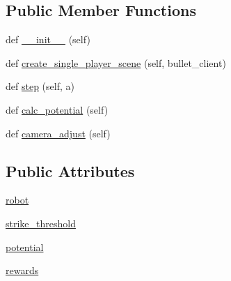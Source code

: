\subsection*{Public Member Functions}
\begin{DoxyCompactItemize}
\item 
def \hyperlink{classpybullet-gym_1_1pybulletgym_1_1envs_1_1roboschool_1_1envs_1_1manipulation_1_1striker__env_1_1_striker_bullet_env_adf904f8a8e85ff0232adb4330beccd10}{\+\_\+\+\_\+init\+\_\+\+\_\+} (self)
\item 
def \hyperlink{classpybullet-gym_1_1pybulletgym_1_1envs_1_1roboschool_1_1envs_1_1manipulation_1_1striker__env_1_1_striker_bullet_env_a7b9fff6ae593b43dbff4164d22d7d0a7}{create\+\_\+single\+\_\+player\+\_\+scene} (self, bullet\+\_\+client)
\item 
def \hyperlink{classpybullet-gym_1_1pybulletgym_1_1envs_1_1roboschool_1_1envs_1_1manipulation_1_1striker__env_1_1_striker_bullet_env_ae29e5028de073baffec0c3a81a351ed7}{step} (self, a)
\item 
def \hyperlink{classpybullet-gym_1_1pybulletgym_1_1envs_1_1roboschool_1_1envs_1_1manipulation_1_1striker__env_1_1_striker_bullet_env_a9435bd65ef1c851dd38bc66dbfb0e288}{calc\+\_\+potential} (self)
\item 
def \hyperlink{classpybullet-gym_1_1pybulletgym_1_1envs_1_1roboschool_1_1envs_1_1manipulation_1_1striker__env_1_1_striker_bullet_env_ae9da23d6f174748abc69a2fcb0ede6ca}{camera\+\_\+adjust} (self)
\end{DoxyCompactItemize}
\subsection*{Public Attributes}
\begin{DoxyCompactItemize}
\item 
\hyperlink{classpybullet-gym_1_1pybulletgym_1_1envs_1_1roboschool_1_1envs_1_1manipulation_1_1striker__env_1_1_striker_bullet_env_ac2655349c64ed19b8d3c010120622367}{robot}
\item 
\hyperlink{classpybullet-gym_1_1pybulletgym_1_1envs_1_1roboschool_1_1envs_1_1manipulation_1_1striker__env_1_1_striker_bullet_env_a15feb48285175d48354c4bdf391651aa}{strike\+\_\+threshold}
\item 
\hyperlink{classpybullet-gym_1_1pybulletgym_1_1envs_1_1roboschool_1_1envs_1_1manipulation_1_1striker__env_1_1_striker_bullet_env_ab0099a4e42a923afa0dfe75638def80e}{potential}
\item 
\hyperlink{classpybullet-gym_1_1pybulletgym_1_1envs_1_1roboschool_1_1envs_1_1manipulation_1_1striker__env_1_1_striker_bullet_env_a458afbccf2851ceb804c6a18f7a7a516}{rewards}
\end{DoxyCompactItemize}



